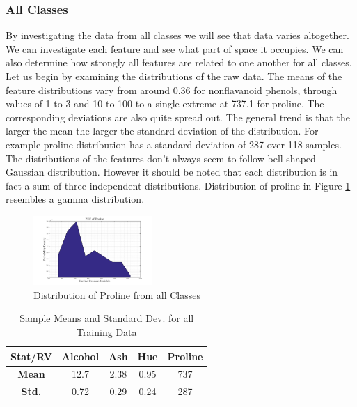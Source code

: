 \documentclass[10pt,twocolumn,letterpaper]{article}
\begin{document}
\subsubsection{All Classes} \label{sec:CovAll}

\indent \indent By investigating the data from all classes we will see that data varies altogether. We can investigate each feature and see what part of space it occupies. We can also determine how strongly all features are related to one another for all classes. Let us begin by examining the distributions of the raw data. The means of the feature distributions vary from around 0.36 for nonflavanoid phenols, through values of 1 to 3 and 10 to 100 to a single extreme at 737.1 for proline. The corresponding deviations are also quite spread out. The general trend is that the larger the mean the larger the standard deviation of the distribution. For example proline distribution has a standard deviation of 287 over 118 samples. The distributions of the features don't always seem to follow bell-shaped Gaussian distribution. However it should be noted that each distribution is in fact a sum of three independent distributions. Distribution of proline in Figure \ref{fig:DistProline} resembles a gamma distribution.

\begin{figure}[H]
\centering
\includegraphics[width=0.4\textwidth]{../results/Q1_ProlineDist}
\caption{Distribution of Proline from all Classes \label{fig:DistProline}}
\end{figure}

\begin{table}[H]
\caption{Sample Means and Standard Dev. for all Training Data \label{tab:statAll}}
\small
\begin{center}
\begin{tabular}{|c| c c c c|}
\hline
\bf Stat/RV & Alcohol & Ash & Hue & Proline \\ [0.5ex]
\hline
\bf Mean & 12.7 & 2.38 & 0.95 & 737 \\ [0.5ex]
\hline
\bf Std. & 0.72 & 0.29 & 0.24 & 287 \\ [0.5ex]
\hline
\end{tabular}
\end{center}
\end{table}
\end{document}
